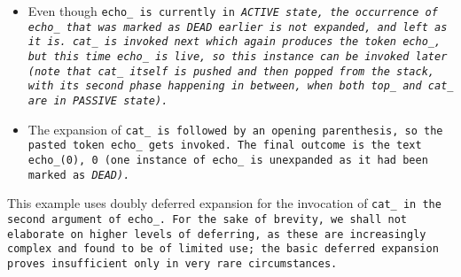 \begin{itemize}[nosep]
\item Even though \tt{echo_} is currently in \it{\tt{ACTIVE}} state,
the occurrence of \tt{echo_} that was marked as
\it{\tt{DEAD}} earlier is not expanded, and left as it is.
\tt{cat_} is invoked next which again produces the token
\tt{echo_}, but this time \tt{echo_} is live, so this instance
can be invoked later (note that \tt{cat_} itself is pushed and then
popped from the stack, with its second phase happening in between,
when both \tt{top_} and \tt{cat_} are in \it{\tt{PASSIVE}} state).

\item The expansion of \tt{cat_} is followed by an opening
parenthesis, so the pasted token \tt{echo_} gets invoked.
The final outcome is the text \tt{echo_(0), 0} (one instance of
\tt{echo_} is unexpanded as it had been marked as \it{\tt{DEAD}}).

\end{itemize}

\note This example uses doubly deferred expansion for the
invocation of \tt{cat_} in the second argument of \tt{echo_}.
For the sake of brevity, we shall not elaborate on higher levels of deferring,
as these are increasingly complex and found to be of limited use; the basic
deferred expansion proves insufficient only in very rare circumstances.
